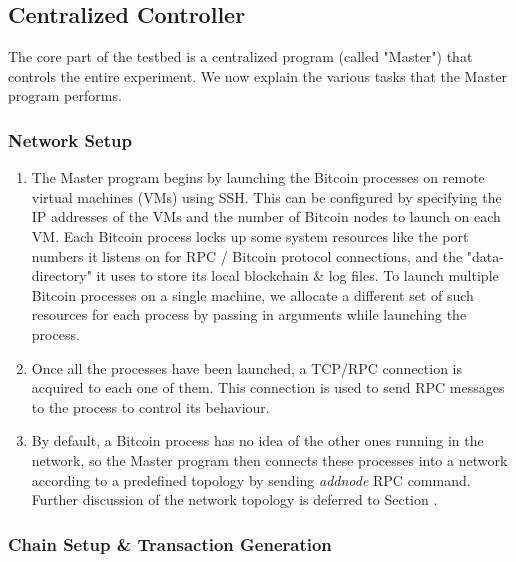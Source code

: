 
\newpage
\subsection{Centralized Controller} \label{impl-master}

The core part of the testbed is a centralized program (called "Master") that controls the entire experiment. We now explain the various tasks that the Master program performs.


\subsubsection{Network Setup}

\begin{enumerate}
    \item The Master program begins by launching the Bitcoin processes on remote virtual machines (VMs) using SSH.
          This can be configured by specifying the IP addresses of the VMs and the number of Bitcoin nodes to launch on each VM.
          Each Bitcoin process locks up some system resources like the port numbers it listens on for RPC / Bitcoin protocol connections, and the "data-directory" it uses to store its local blockchain \& log files.
          To launch multiple Bitcoin processes on a single machine, we allocate a different set of such resources for each process by passing in arguments while launching the process.

    \item Once all the processes have been launched, a TCP/RPC connection is acquired to each one of them. 
          This connection is used to send RPC messages to the process to control its behaviour.

    \item By default, a Bitcoin process has no idea of the other ones running in the network, so the Master program then connects these processes into a network according to a predefined topology by sending \textit{addnode} RPC command.
          Further discussion of the network topology is deferred to Section .
\end{enumerate}
      
\subsubsection{Chain Setup \& Transaction Generation}

